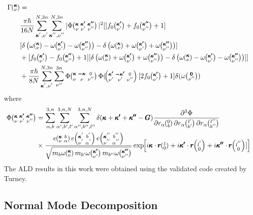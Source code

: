 \begin{equation}\label{EQ:Gamma_anh}
\begin{split}
\Gamma \kv &= \\
&\frac{\pi\hbar}{16N}\SUM[']\SUM['']|\Phi\kvkvpkvpp|^2[[f_0\kvp+f_0\kvpp+1]\\
&[\delta\left(\omega\kv-\omega\kvp-\omega\kvpp\right)-\delta\left(\omega\kv+\omega\kvp+\omega\kvpp\right)]\\
&+[f_0\kvp-f_0\kvpp+1][\delta\left(\omega\kv+\omega\kvp+\omega\kvpp\right)-\delta\left(\omega\kv-\omega\kvp-\omega\kvpp\right)]]\\
&+\frac{\pi\hbar}{8N}\SUM[']\sum_{\nu''}^{3n}\Phi\kvOv\Phi(\kvpOv[2f_0\kvp+1]\delta(\omega\Ovpp)
\end{split}
\end{equation}
%
where
%
\begin{equation}\label{EQ:Phi_anh}
\begin{split}
\Phi\kvkvpkvpp&=\sum_{\alpha,b}^{3,n}\sum_{\alpha',b',l'}^{3,n,N}\sum_{\alpha'',b'',l''}^{3,n,N}\delta(\pmb{\kappa}+\pmb{\kappa'}+\pmb{\kappa''}-\pmb{G})\frac{\partial^3\Phi}{\partial r_\alpha \Ob \partial r_\alpha \lbp \partial r_\alpha \lbpp}\\
&\times \frac{e \kvba e \kvbain{'}e \kvbain{''}}{\sqrt{m_{b}\omega\kv
m_{b'}\omega\kvp m_{b''}\omega\kvpp}}\EXP{i\pmb{\kappa}\cdot \pmb{r}\lO+i\pmb{\kappa'}\cdot \pmb{r}\lOin{'}+i\pmb{\kappa''}\cdot \pmb{r}\lOin{''}]}
\end{split}
\end{equation}
%
The ALD results in this work were obtained using the validated code created by Turney.\cite{turneythesis}

\subsection{Normal Mode Decomposition}

